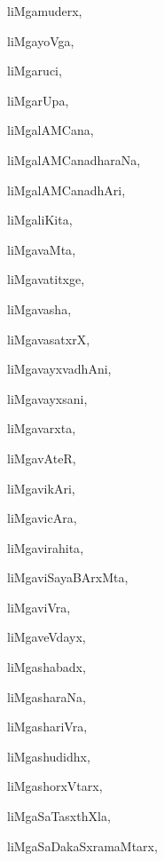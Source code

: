\begin{multicols}{3}
{\noindent
{liMgamuderx}, \pageref{liMgamuderx}

\noindent
{liMgayoVga}, \pageref{liMgayoVga}

\noindent
{liMgaruci}, \pageref{liMgaruci}

\noindent
{liMgarUpa}, \pageref{liMgarUpa}

\noindent
{liMgalAMCana}, \pageref{liMgalAMCana}

\noindent
{liMgalAMCanadharaNa}, \pageref{liMgalAMCanadharaNa}

\noindent
{liMgalAMCanadhAri}, \pageref{liMgalAMCanadhAri}

\noindent
{liMgaliKita}, \pageref{liMgaliKita}

\noindent
{liMgavaMta}, \pageref{liMgavaMta}

\noindent
{liMgavatitxge}, \pageref{liMgavatitxge}

\noindent
{liMgavasha}, \pageref{liMgavasha}

\noindent
{liMgavasatxrX}, \pageref{liMgavasatxrX}

\noindent
{liMgavayxvadhAni}, \pageref{liMgavayxvadhAni}

\noindent
{liMgavayxsani}, \pageref{liMgavayxsani}

\noindent
{liMgavarxta}, \pageref{liMgavarxta}

\noindent
{liMgavAteR}, \pageref{liMgavAteR}

\noindent
{liMgavikAri}, \pageref{liMgavikAri}

\noindent
{liMgavicAra}, \pageref{liMgavicAra}

\noindent
{liMgavirahita}, \pageref{liMgavirahita}

\noindent
{liMgaviSayaBArxMta}, \pageref{liMgaviSayaBArxMta}

\noindent
{liMgaviVra}, \pageref{liMgaviVra}

\noindent
{liMgaveVdayx}, \pageref{liMgaveVdayx}

\noindent
{liMgashabadx}, \pageref{liMgashabadx}

\noindent
{liMgasharaNa}, \pageref{liMgasharaNa}

\noindent
{liMgashariVra}, \pageref{liMgashariVra}

\noindent
{liMgashudidhx}, \pageref{liMgashudidhx}

\noindent
{liMgashorxVtarx}, \pageref{liMgashorxVtarx}

\noindent
{liMgaSaTasxthXla}, \pageref{liMgaSaTasxthXla}

\noindent
{liMgaSaDakaSxramaMtarx}, \pageref{liMgaSaDakaSxramaMtarx}

}
\end{multicols}
